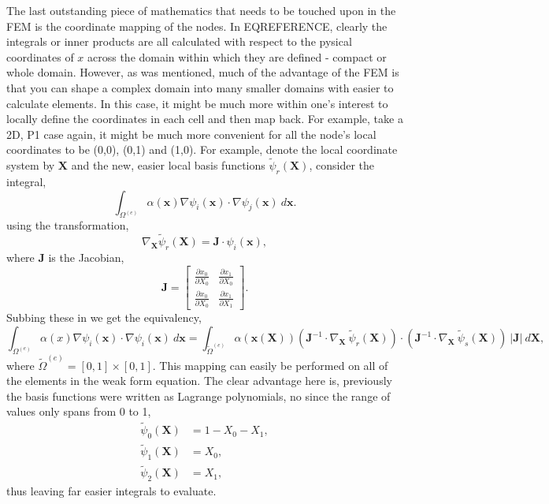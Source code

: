 The last outstanding piece of mathematics that needs to be touched upon in the FEM is the coordinate mapping of the nodes. In EQREFERENCE,  clearly the integrals or inner products are all calculated with respect to the pysical coordinates of $x$ across the domain within which they are defined - compact or whole domain. However, as was mentioned, much of the advantage of the FEM is that you can shape a complex domain into many smaller domains with easier to calculate elements. In this case, it might be much more within one's interest to locally define the coordinates in each cell and then map back. For example, take a 2D, P1 case again, it might be much more convenient for all the node's local coordinates to be (0,0), (0,1) and (1,0). For example, denote the local coordinate system by $\mathbf{X}$ and the new, easier local basis functions $\tilde\psi_r(\mathbf{X})$, consider the integral,
\begin{equation}
	\int_{\Omega^{(e)}} \alpha(\mathbf{x})\nabla \psi_i(\mathbf{x}) \cdot \nabla \psi_j(\mathbf{x})~d\mathbf{x}.
\end{equation}
using the transformation,
\begin{equation}
	\nabla_\mathbf{X}\tilde\psi_r(\mathbf{X}) = \mathbf{J}\cdot \psi_i(\mathbf{x}),
\end{equation}
where $\mathbf{J}$ is the Jacobian,
\begin{equation}
	\mathbf{J} =
	\left[\begin{matrix}
		\frac{\partial x_0}{\partial X_0} & \frac{\partial x_1}{\partial X_0}\\
		\frac{\partial x_0}{\partial X_0} & \frac{\partial x_1}{\partial X_1}
	\end{matrix}\right].
\end{equation}
Subbing these in we get the equivalency,
\begin{equation}
	\int_{\Omega^{(e)}} \alpha(x)\nabla \psi_i(\mathbf{x}) \cdot \nabla \psi_i(\mathbf{x})~d\mathbf{x} = \int_{\tilde{\Omega}^{(e)}} \alpha(\mathbf{x}(\mathbf{X}))(\mathbf{J}^{-1}\cdot\nabla_\mathbf{X}~\tilde\psi_r(\mathbf{X}) )\cdot(\mathbf{J}^{-1}\cdot\nabla_\mathbf{X}~\tilde\psi_s(\mathbf{X}))~\vert\mathbf{J}\vert~d\mathbf{X},
\end{equation}
where ${\tilde{\Omega}^{(e)}} = [0,1]\times[0,1]$. This mapping can easily be performed on all of the elements in the weak form equation. The clear advantage here is, previously the basis functions were written as Lagrange polynomials, no since the range of values only spans from 0 to 1,
\begin{align}
	\tilde\psi_0(\mathbf{X}) &= 1 - X_0 - X_1,\\
	\tilde\psi_1(\mathbf{X}) &= X_0,\\
	\tilde\psi_2(\mathbf{X}) &= X_1,
\end{align}
thus leaving far easier integrals to evaluate.

